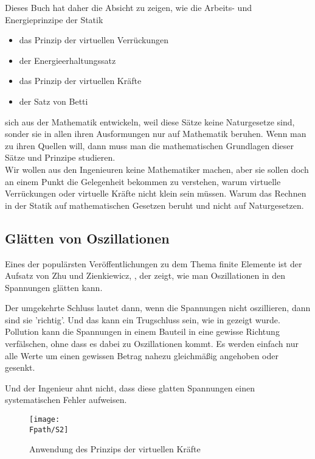 {{Dieses Buch hat daher die Absicht zu zeigen, wie die Arbeits- und Energieprinzipe der Statik

\begin{itemize}
  \item das Prinzip der virtuellen Verr\"{u}ckungen
  \item der Energieerhaltungssatz
  \item das Prinzip der virtuellen Kr\"{a}fte
  \item der Satz von Betti
\end{itemize}
sich aus der Mathematik entwickeln, weil diese S\"{a}tze keine Naturgesetze sind, sonder sie in allen ihren Ausformungen nur auf Mathematik beruhen. Wenn man zu ihren Quellen will, dann muss man die mathematischen Grundlagen dieser S\"{a}tze und Prinzipe studieren.\\

Wir wollen aus den Ingenieuren keine Mathematiker machen, aber sie sollen doch an einem Punkt die Gelegenheit bekommen zu verstehen, warum virtuelle Verr\"{u}ckungen oder virtuelle Kr\"{a}fte nicht klein sein m\"{u}ssen. Warum das Rechnen in der Statik auf mathematischen Gesetzen beruht und nicht auf Naturgesetzen.\\

{\textcolor{blau2}{\section{Gl\"{a}tten von Oszillationen}}
Eines der popul\"{a}rsten Ver\"{o}ffentlichungen zu dem Thema finite Elemente ist der Aufsatz von Zhu und Zienkiewicz, \cite{Z2}, der zeigt, wie man Oszillationen in den Spannungen gl\"{a}tten kann.

Der umgekehrte Schluss lautet dann, wenn die Spannungen nicht oszillieren, dann sind sie 'richtig'. Und das kann ein Trugschluss sein, wie in \cite{Babuska5} gezeigt wurde. Pollution kann die Spannungen in einem Bauteil in eine gewisse Richtung verf\"{a}lschen, ohne dass es dabei zu Oszillationen kommt. Es werden einfach nur alle Werte um einen gewissen Betrag nahezu gleichm\"{a}{\ss}ig angehoben oder gesenkt.

Und der Ingenieur ahnt nicht, dass diese glatten Spannungen einen systematischen Fehler aufweisen.

\begin{figure}[tbp]
\centering
\if {} \sidecaption \fi
\texttt{[image: \\Fpath/S2]}
\caption{Anwendung des Prinzips der virtuellen Kr\"{a}fte} \label{S2}
%
\end{figure}%

}}}
